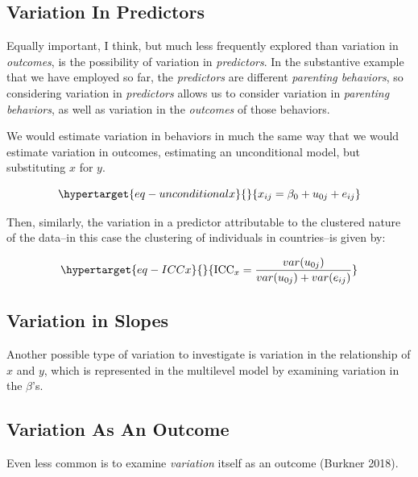 \documentclass[
  letterpaper,
  DIV=11,
  numbers=noendperiod]{scrreprt}
\begin{document}
\hypertarget{variation-in-predictors}{%
\subsection{Variation In Predictors}\label{variation-in-predictors}}

Equally important, I think, but much less frequently explored than
variation in \emph{outcomes}, is the possibility of variation in
\emph{predictors}. In the substantive example that we have employed so
far, the \emph{predictors} are different \emph{parenting behaviors}, so
considering variation in \emph{predictors} allows us to consider
variation in \emph{parenting behaviors}, as well as variation in the
\emph{outcomes} of those behaviors.

We would estimate variation in behaviors in much the same way that we
would estimate variation in outcomes, estimating an unconditional model,
but substituting \(x\) for \(y\).

\begin{equation}\protect\hypertarget{eq-unconditionalx}{}{x_{ij} = \beta_0 + u_{0j} + e_{ij}}\label{eq-unconditionalx}\end{equation}

Then, similarly, the variation in a predictor attributable to the
clustered nature of the data--in this case the clustering of individuals
in countries--is given by:

\begin{equation}\protect\hypertarget{eq-ICCx}{}{\text{ICC}_x = \frac{var(u_{0j})}{var(u_{0j}) + var(e_{ij})}}\label{eq-ICCx}\end{equation}

\hypertarget{variation-in-slopes}{%
\subsection{Variation in Slopes}\label{variation-in-slopes}}

Another possible type of variation to investigate is variation in the
relationship of \(x\) and \(y\), which is represented in the multilevel
model by examining variation in the \(\beta\)'s.

\hypertarget{variation-as-an-outcome}{%
\subsection{Variation As An Outcome}\label{variation-as-an-outcome}}

Even less common is to examine \emph{variation} itself as an outcome
(Burkner 2018).
\end{document}
